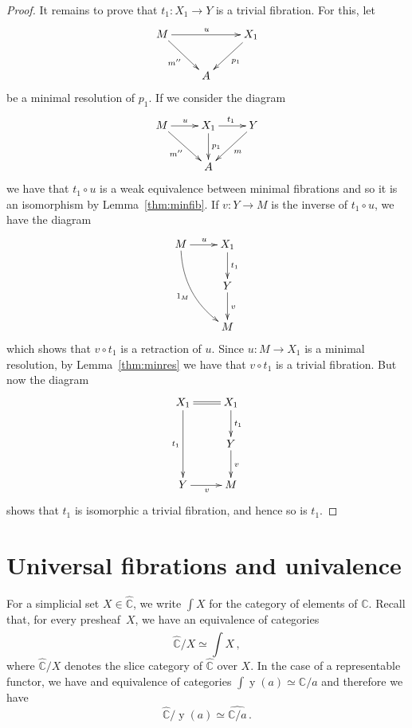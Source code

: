 \documentclass[reqno,10pt,a4paper,oneside]{amsart}
\theoremstyle{definition}
\newcommand{\co}{\colon}
\newcommand{\cat}[1]{\mathbb{#1}}
\newcommand{\catC}{\cat{C}}
\begin{document}
\begin{proof}
  \medskip
 
 It remains to prove that $t_1 \co X_1 \to Y$ is a trivial fibration. For this, let 
 \[
 \xymatrix{
 M \ar[dr]_{m''} \ar[rr]^{u} & & X_1 \ar[dl]^{p_1} \\
  & A & }
  \]
  be a minimal resolution of $p_1$.      If we consider the diagram
  \[
  \xymatrix{
  M \ar[dr]_{m''} \ar[r]^{u} & X_1 \ar[r]^{t_1} \ar[d]^{p_1} & Y \ar[dl]^{m} \\
   & A &   }
   \]
   we have that $t_1 \circ u$ is a weak equivalence between minimal fibrations and so it is
   an isomorphism by Lemma~\ref{thm:minfib}. If $v \co Y \to M$ is the inverse of $t_1  \circ u$,
   we have the diagram
   \[
   \xymatrix{
   M \ar[r]^u \ar@/_1pc/[ddr]_{1_M} & X_1 \ar[d]^{t_1} \\
     & Y \ar[d]^{v} \\
     & M}
     \]
which shows that $v \circ t_1$ is a retraction of $u$. Since $u \co M \to X_1$ 
is a minimal resolution, by Lemma~\ref{thm:minres} we have that $v \circ t_1$ is
a trivial fibration. But now the diagram 
 \[
 \xymatrix{
 X_1 \ar@{=}[r] \ar[dd]_{t_1} & X_1 \ar[d]^{t_1} \\
  & Y \ar[d]^{v} \\
  Y \ar[r]_v & M }
  \]
shows that $t_1$ is isomorphic a trivial
fibration, and hence so is $t_1$.
\end{proof}


\section{Universal fibrations and univalence}

\newcommand{\pshC}{\widehat{\catC}}
\newcommand{\Set}{\mathbf{Set}}
\newcommand{\yon}{\operatorname{y}}



For a simplicial set $X \in \pshC$, we write $\int X$ for the category of elements of $\catC$. Recall that, for every 
presheaf~$X$, we have an equivalence of categories
\[
\textstyle
\pshC/X \simeq \widehat{\int X} \, ,
\]
where $\pshC/X$ denotes the slice category of $\pshC$ over $X$. 
In the case of a representable functor, we have and equivalence 
of categories $\int \yon(a) \simeq \catC /a$ and therefore we have
\begin{equation}
\label{equ:equivslice}
\pshC/ \yon(a) \simeq \widehat{\catC/a} \, .
\end{equation}

\medskip
\end{document}
